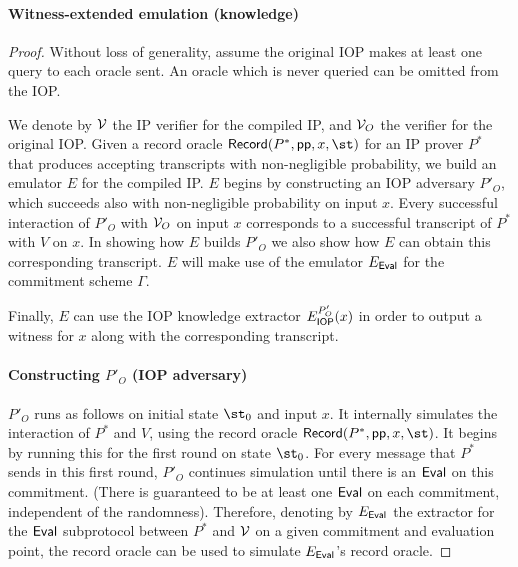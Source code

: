 \paragraph{Witness-extended emulation (knowledge)}

\begin{proof}
Without loss of generality, assume the original IOP makes at least one query to each oracle sent. An oracle which is never queried can be omitted from the IOP.

We denote by $\mathcal{V}$ the IP verifier for the compiled IP, and $\mathcal{V}_{O}$ the verifier for the original IOP. 
Given a record oracle $\pro{Record}(P^*, \params, x, \st)$ for an IP prover $P^*$ that produces accepting transcripts with non-negligible probability, we build an emulator $E$ for the compiled IP. $E$ begins by constructing an IOP adversary $P'_{O}$, which succeeds also with non-negligible probability on input $x$. Every successful interaction of $P'_{O}$ with $\mathcal{V}_{O}$ on input $x$ corresponds to a successful transcript of $P^*$ with $V$ on $x$. In showing how $E$ builds $P'_{O}$ we also show how $E$ can obtain this corresponding transcript. $E$ will make use of the emulator $E_\textsf{{Eval}}$ for the commitment scheme $\Gamma$. %

Finally, $E$ can use the IOP knowledge extractor $E_{\textsf{{IOP}}}^{P'_O}(x)$ in order to output a witness for $x$ along with the corresponding transcript. 

\paragraph{Constructing $P'_O$ (IOP adversary)}
$P'_O$ runs as follows on initial state $\st_0$ and input $x$. It internally simulates the interaction of $P^*$ and $V$, using the record oracle $\pro{Record}(P^*, \params, x, \st)$. It begins by running this for the first round on state $\st_0$. For every message that $P^*$ sends in this first round, $P'_O$ continues simulation until there is an $\textsf{{Eval}}$ on this commitment. (There is guaranteed to be at least one $\textsf{{Eval}}$ on each commitment, independent of the randomness). Therefore, denoting by $E_\textsf{{Eval}}$ the extractor for the $\textsf{{Eval}}$ subprotocol between $P^*$ and $\mathcal{V}$ on a given commitment and evaluation point, the record oracle can be used to simulate $E_\textsf{{Eval}}$'s record oracle.%


\end{proof}
